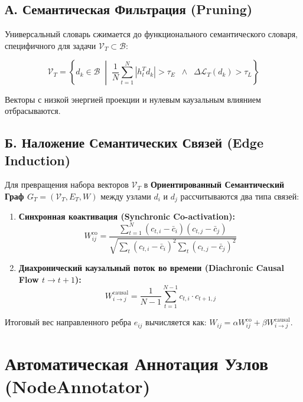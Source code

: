 \documentclass[11pt,a4paper]{article}
\begin{document}
\subsection*{А. Семантическая Фильтрация (Pruning)}
Универсальный словарь сжимается до функционального семантического словаря, специфичного для задачи $\mathcal{V}_T \subset \mathcal{B}$:

\begin{equation}
\mathcal{V}_T = \left\{ d_k \in \mathcal{B} \;\middle|\; \frac{1}{N} \sum_{t=1}^N |h_t^T d_k| > \tau_E \;\;\land\;\; \Delta \mathcal{L}_T(d_k) > \tau_L \right\}
\end{equation}

Векторы с низкой энергией проекции и нулевым каузальным влиянием отбрасываются.

\subsection*{Б. Наложение Семантических Связей (Edge Induction)}
Для превращения набора векторов $\mathcal{V}_T$ в \textbf{Ориентированный Семантический Граф $G_T = (\mathcal{V}_T, E_T, W)$} между узлами $d_i$ и $d_j$ рассчитываются два типа связей:

\begin{enumerate}
    \item \textbf{Синхронная коактивация (Synchronic Co-activation):}
    \begin{equation}
    W_{ij}^{\text{co}} = \frac{\sum_{t=1}^N (c_{t,i} - \bar{c}_i)(c_{t,j} - \bar{c}_j)}{\sqrt{\sum_t (c_{t,i} - \bar{c}_i)^2 \sum_t (c_{t,j} - \bar{c}_j)^2}}
    \end{equation}
    
    \item \textbf{Диахронический каузальный поток во времени (Diachronic Causal Flow $t \to t+1$):}
    \begin{equation}
    W_{i \to j}^{\text{causal}} = \frac{1}{N-1} \sum_{t=1}^{N-1} c_{t,i} \cdot c_{t+1, j}
    \end{equation}
\end{enumerate}

Итоговый вес направленного ребра $e_{ij}$ вычисляется как: $W_{ij} = \alpha W_{ij}^{\text{co}} + \beta W_{i \to j}^{\text{causal}}$.

\section{Автоматическая Аннотация Узлов (NodeAnnotator)}
\end{document}
